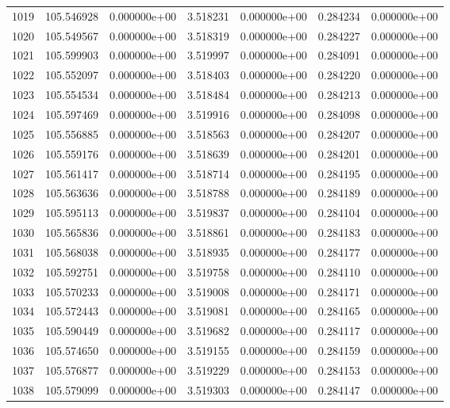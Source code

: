 \begin{tabular}{rrrrrrr}
1019 & 105.546928 &  0.000000e+00 &  3.518231 &  0.000000e+00 &    0.284234 &  0.000000e+00 \\
1020 & 105.549567 &  0.000000e+00 &  3.518319 &  0.000000e+00 &    0.284227 &  0.000000e+00 \\
1021 & 105.599903 &  0.000000e+00 &  3.519997 &  0.000000e+00 &    0.284091 &  0.000000e+00 \\
1022 & 105.552097 &  0.000000e+00 &  3.518403 &  0.000000e+00 &    0.284220 &  0.000000e+00 \\
1023 & 105.554534 &  0.000000e+00 &  3.518484 &  0.000000e+00 &    0.284213 &  0.000000e+00 \\
1024 & 105.597469 &  0.000000e+00 &  3.519916 &  0.000000e+00 &    0.284098 &  0.000000e+00 \\
1025 & 105.556885 &  0.000000e+00 &  3.518563 &  0.000000e+00 &    0.284207 &  0.000000e+00 \\
1026 & 105.559176 &  0.000000e+00 &  3.518639 &  0.000000e+00 &    0.284201 &  0.000000e+00 \\
1027 & 105.561417 &  0.000000e+00 &  3.518714 &  0.000000e+00 &    0.284195 &  0.000000e+00 \\
1028 & 105.563636 &  0.000000e+00 &  3.518788 &  0.000000e+00 &    0.284189 &  0.000000e+00 \\
1029 & 105.595113 &  0.000000e+00 &  3.519837 &  0.000000e+00 &    0.284104 &  0.000000e+00 \\
1030 & 105.565836 &  0.000000e+00 &  3.518861 &  0.000000e+00 &    0.284183 &  0.000000e+00 \\
1031 & 105.568038 &  0.000000e+00 &  3.518935 &  0.000000e+00 &    0.284177 &  0.000000e+00 \\
1032 & 105.592751 &  0.000000e+00 &  3.519758 &  0.000000e+00 &    0.284110 &  0.000000e+00 \\
1033 & 105.570233 &  0.000000e+00 &  3.519008 &  0.000000e+00 &    0.284171 &  0.000000e+00 \\
1034 & 105.572443 &  0.000000e+00 &  3.519081 &  0.000000e+00 &    0.284165 &  0.000000e+00 \\
1035 & 105.590449 &  0.000000e+00 &  3.519682 &  0.000000e+00 &    0.284117 &  0.000000e+00 \\
1036 & 105.574650 &  0.000000e+00 &  3.519155 &  0.000000e+00 &    0.284159 &  0.000000e+00 \\
1037 & 105.576877 &  0.000000e+00 &  3.519229 &  0.000000e+00 &    0.284153 &  0.000000e+00 \\
1038 & 105.579099 &  0.000000e+00 &  3.519303 &  0.000000e+00 &    0.284147 &  0.000000e+00 \\

\end{tabular}
